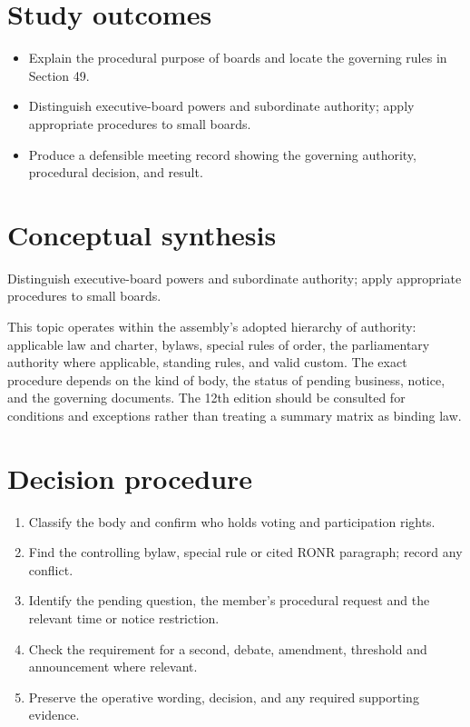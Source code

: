 \documentclass[11pt]{article}
\begin{document}
\SuiteOpen
{}
\section{Study outcomes}
\begin{itemize}[leftmargin=*,itemsep=4pt]
\item Explain the procedural purpose of boards and locate the governing rules in Section 49.
\item Distinguish executive-board powers and subordinate authority; apply appropriate procedures to small boards.
\item Produce a defensible meeting record showing the governing authority, procedural decision, and result.
\end{itemize}

\section{Conceptual synthesis}
Distinguish executive-board powers and subordinate authority; apply appropriate procedures to small boards.

This topic operates within the assembly’s adopted hierarchy of authority: applicable law and charter, bylaws, special rules of order, the parliamentary authority where applicable, standing rules, and valid custom. The exact procedure depends on the kind of body, the status of pending business, notice, and the governing documents. The 12th edition should be consulted for conditions and exceptions rather than treating a summary matrix as binding law.
\section{Decision procedure}
\begin{enumerate}[leftmargin=*,itemsep=4pt]
\item Classify the body and confirm who holds voting and participation rights.
\item Find the controlling bylaw, special rule or cited RONR paragraph; record any conflict.
\item Identify the pending question, the member’s procedural request and the relevant time or notice restriction.
\item Check the requirement for a second, debate, amendment, threshold and announcement where relevant.
\item Preserve the operative wording, decision, and any required supporting evidence.
\end{enumerate}
\end{document}

